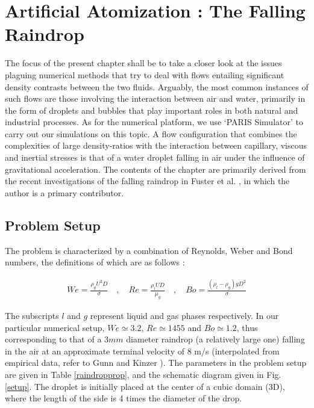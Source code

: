 \setchapterpreamble[u]{\margintoc}
\chapter{Artificial Atomization : The Falling Raindrop}

The focus of the present chapter shall be to take a closer look at the issues 
plaguing numerical methods that try to deal with flows 
entailing significant density contrasts between the two fluids. 
Arguably, the most common instances of such flows are those involving the interaction
between air and water, primarily in the form of droplets and 
bubbles that play important roles in both natural and industrial processes. 
As for the numerical platform, we use `PARIS Simulator' 
to carry out our simulations on this topic. 
A flow configuration that combines the complexities of large 
density-ratios with the interaction between capillary, viscous and 
inertial stresses is that of a water droplet falling in 
air under the influence of gravitational acceleration.
The contents of the chapter are primarily derived 
from the recent investigations of the falling raindrop  
in Fuster et al. , in which
the author is a primary contributor. 
\section{Problem Setup}

The problem is characterized by a combination of Reynolds, 
Weber and Bond numbers, the definitions of which are as follows : 

\begin{align}
We=\frac{\rho_{g} U^2 D}{\sigma} \quad,\quad Re= \frac{\rho_{l} U D}{\mu_{g}} \quad,\quad Bo=\frac{\left(\rho_{l}-\rho_{g}\right) g D^2 }{\sigma}
\end{align}



The subscripts $l$ and $g$ represent liquid and gas phases respectively. 
In our particular numerical setup, $We \simeq 3.2 $, $Re \simeq 1455 $ and $Bo \simeq 1.2 $, 
thus corresponding to that of a $3mm$ diameter raindrop (a relatively large one) 
falling in the air at an approximate terminal velocity of  
$8$ m/s (interpolated from empirical data, refer to Gunn and Kinzer \cite{gunn1949}). 
The parameters in the problem setup are given in Table \ref{raindropprop}, 
and the schematic diagram given in Fig. \ref{setup}. 
The droplet is initially placed at the center of a cubic domain (3D), 
where the length of the side is 4 times the diameter of the drop. 

